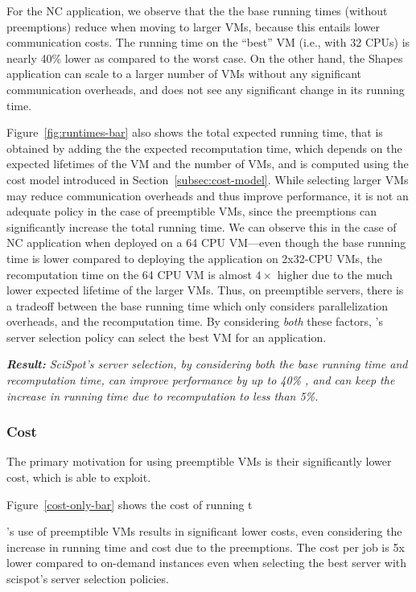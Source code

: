 For the NC application, we observe that the the base running times (without preemptions) reduce when moving to larger VMs, because this entails lower communication costs.
The running time on the ``best'' VM (i.e., with 32 CPUs) is nearly 40\% lower as compared to the worst case. 
On the other hand, the Shapes application can scale to a larger number of VMs without any significant communication overheads, and does not see any significant change in its running time.

Figure~\ref{fig:runtimes-bar} also shows the total expected running time, that is obtained by adding the the expected recomputation time, which depends on the expected lifetimes of the VM and the number of VMs, and is computed using the cost model introduced in Section~\ref{subsec:cost-model}. 
While selecting larger VMs may reduce communication overheads and thus improve performance, it is not an adequate policy in the case of preemptible VMs, since the preemptions can significantly increase the total running time.
We can observe this in the case of NC application when deployed on a 64 CPU VM---even though the base running time is lower compared to deploying the application on 2x32-CPU VMs, the recomputation time on the 64 CPU VM is almost $4\times$ higher due to the much lower expected lifetime of the larger VMs. 
Thus, on preemptible servers, there is a tradeoff between the base running time which only considers parallelization overheads, and the recomputation time.
By considering \emph{both} these factors, \sysname's server selection policy can select the best VM for an application. 


\noindent \emph{ \textbf{Result:} SciSpot's server selection, by considering both the base running time and recomputation time, can improve performance by up to 40\% , and can keep the increase in running time due to recomputation to less than 5\%.}



\subsubsection{Cost}

The primary motivation for using preemptible VMs is their significantly lower cost, which \sysname is able to exploit.

Figure~\ref{cost-only-bar} shows the cost of running t

\sysname's use of preemptible VMs results in significant lower costs, even considering the increase in running time and cost due to the preemptions.
The cost per job is 5x lower compared to on-demand instances even when selecting the best server with scispot's server selection policies.



